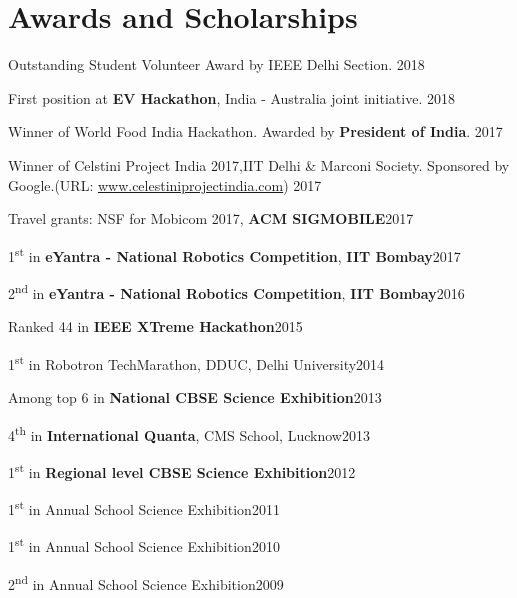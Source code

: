 \section{Awards and Scholarships}
\begin{innerlist}
\item Outstanding Student Volunteer Award by IEEE Delhi Section. \hfill 2018
\item First position at \textbf{EV Hackathon}, India - Australia joint initiative. \hfill 2018
\item Winner of World Food India Hackathon. Awarded by \textbf{President of India}. \hfill 2017
\item  Winner of Celstini Project India 2017,IIT Delhi & Marconi Society. Sponsored by Google.(URL: \href{http://www.celestiniprojectindia.com}{www.celestiniprojectindia.com}) \hfill 2017
\item Travel grants: NSF for Mobicom 2017, \textbf{ACM SIGMOBILE}\hfill 2017
\item 1\textsuperscript{st} in \textbf{eYantra - National Robotics Competition}, \textbf{IIT Bombay}\hfill 2017
\item 2\textsuperscript{nd} in \textbf{eYantra - National Robotics Competition}, \textbf{IIT Bombay}\hfill 2016
\item Ranked 44 in \textbf{IEEE XTreme Hackathon}\hfill  2015
\item 1\textsuperscript{st} in Robotron TechMarathon, DDUC, Delhi University\hfill 2014
\item Among top 6 in \textbf{National CBSE Science Exhibition}\hfill  2013
\item 4\textsuperscript{th} in \textbf{International Quanta}, CMS School, Lucknow\hfill 2013
\item 1\textsuperscript{st} in \textbf{Regional level CBSE Science Exhibition}\hfill  2012
\item 1\textsuperscript{st} in Annual School Science Exhibition\hfill 2011
\item 1\textsuperscript{st} in Annual School Science Exhibition\hfill  2010
\item 2\textsuperscript{nd} in Annual School Science Exhibition\hfill  2009
\end{innerlist}

